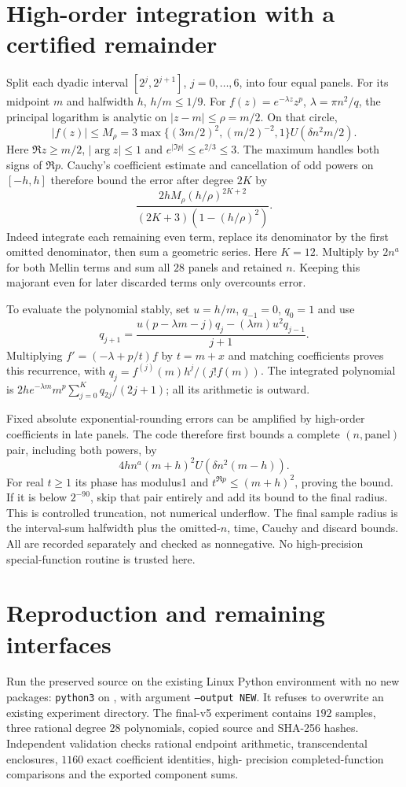 \documentclass[11pt,oneside,openany]{book}
\theoremstyle{definition}\newtheorem{definition}[theorem]{Definition}
\theoremstyle{remark}\newtheorem{remark}[theorem]{Remark}
\begin{document}
\section{High-order integration with a certified remainder}
Split each dyadic interval $[2^j,2^{j+1}]$, $j=0,\ldots,6$, into four equal
panels. For its midpoint $m$ and halfwidth $h$, $h/m\le1/9$.
For $f(z)=e^{-\lambda z}z^p$, $\lambda=\pi n^2/q$, the principal logarithm
is analytic on $|z-m|\le\rho=m/2$. On that circle,
\[
 |f(z)|\le M_\rho=3\max\{(3m/2)^2,(m/2)^{-2},1\}
 U(\delta n^2m/2).
\]
Here $\Re z\ge m/2$, $|\arg z|\le1$ and
$e^{|\Im p|}\le e^{2/3}\le3$. The maximum handles both signs of $\Re p$.
Cauchy's coefficient estimate and cancellation of odd powers on $[-h,h]$
therefore bound the error after degree $2K$ by
\[
 \frac{2hM_\rho(h/\rho)^{2K+2}}
 {(2K+3)(1-(h/\rho)^2)}.
\]
Indeed integrate each remaining even term, replace its denominator by the
first omitted denominator, then sum a geometric series. Here $K=12$.
Multiply by $2n^a$ for both Mellin terms and sum all $28$ panels and retained $n$.
Keeping this majorant even for later discarded terms only overcounts error.

To evaluate the polynomial stably, set $u=h/m$, $q_{-1}=0$, $q_0=1$ and use
\[
 q_{j+1}=\frac{u(p-\lambda m-j)q_j-(\lambda m)u^2q_{j-1}}{j+1}.
\]
Multiplying $f'=(-\lambda+p/t)f$ by $t=m+x$ and matching coefficients proves
this recurrence, with $q_j=f^{(j)}(m)h^j/(j!f(m))$. The integrated polynomial is
$2he^{-\lambda m}m^p\sum_{j=0}^{K}q_{2j}/(2j+1)$; all its arithmetic is outward.

Fixed absolute exponential-rounding errors can be amplified by high-order
coefficients in late panels. The code therefore first bounds a complete
$(n,\text{panel})$ pair, including both powers, by
\[
 4hn^a(m+h)^2U(\delta n^2(m-h)).
\]
For real $t\ge1$ its phase has modulus1 and $t^{\Re p}\le(m+h)^2$, proving
the bound. If it is below $2^{-90}$, skip that pair entirely and add its bound
to the final radius. This is controlled truncation, not numerical underflow.
The final sample radius is the interval-sum halfwidth plus the omitted-$n$,
time, Cauchy and discard bounds. All are recorded separately and checked as
nonnegative. No high-precision special-function routine is trusted here.

\section{Reproduction and remaining interfaces}
Run the preserved source on the existing Linux Python environment with no new
packages: \texttt{python3} on , with argument \texttt{--output NEW}.
It refuses to overwrite an existing experiment directory. The final-v5
experiment contains $192$ samples, three rational degree $28$ polynomials, copied
source and SHA-256 hashes. Independent validation checks rational endpoint
arithmetic, transcendental enclosures, $1160$ exact coefficient identities, high-
precision completed-function comparisons and the exported component sums.
\end{document}
